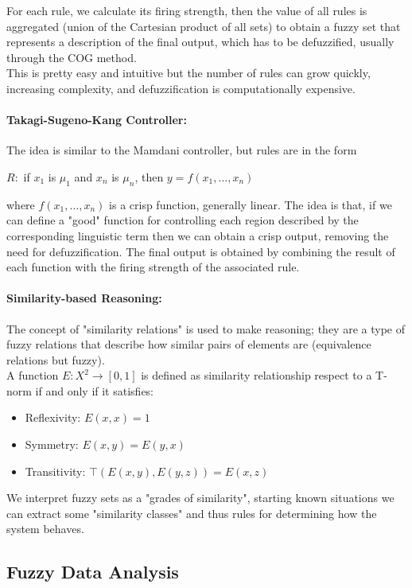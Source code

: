 For each rule, we calculate its firing strength, then the value of all rules is aggregated (union of the Cartesian product of all sets) to obtain a fuzzy set that represents a description of the final output, which has to be defuzzified, usually through the COG method.\\

This is pretty easy and intuitive but the number of rules can grow quickly, increasing complexity, and defuzzification is computationally expensive.\\

\paragraph{Takagi-Sugeno-Kang Controller:} The idea is similar to the Mamdani controller, but rules are in the form
\begin{center}
	$R:$ if $x_1$ is $\mu_1$ and $x_n$ is $\mu_n$, then $y = f(x_1, \dots , x_n)$ 
\end{center}
where $f(x_1, \dots , x_n)$ is a crisp function, generally linear. The idea is that, if we can define a "good" function for controlling each region described by the corresponding linguistic term then we can obtain a crisp output, removing the need for defuzzification. The final output is obtained by combining the result of each function with the firing strength of the associated rule.\\

\paragraph{Similarity-based Reasoning:} The concept of "similarity relations" is used to make reasoning; they are a type of fuzzy relations that describe how similar pairs of elements are (equivalence relations but fuzzy). \\

A function $E:X^2 \rightarrow [0,1]$ is defined as similarity relationship respect to a T-norm if and only if it satisfies:
\begin{itemize}
	\item Reflexivity: $E(x,x) = 1$ 
	\item Symmetry: $E(x,y) = E(y,x)$
	\item Transitivity: $\top (E(x,y),E(y,z)) = E(x,z)$
\end{itemize}

We interpret fuzzy sets as a "grades of similarity", starting known situations we can extract some "similarity classes" and thus rules for determining how the system behaves.\\

\subsection{Fuzzy Data Analysis}
